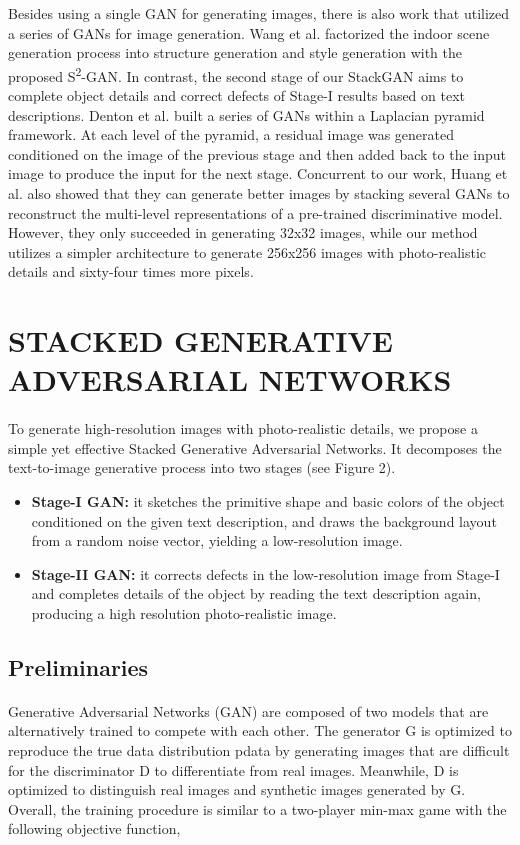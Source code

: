 \documentclass[a4paper,12pt,oneside]{article}
\begin{document}
Besides using a single GAN for generating images, there is also work that utilized a series of GANs for image generation. Wang et al. factorized the indoor scene generation process into structure generation and style generation with the proposed S\textsuperscript{2}-GAN. In contrast, the second stage of our StackGAN aims to complete object details and correct defects of Stage-I results based on text descriptions. Denton et al. built a series of GANs within a Laplacian pyramid framework. At each level of the pyramid, a residual image was generated conditioned on the image of the previous stage and then added back to the input image to produce the input for the next stage. Concurrent to our work, Huang et al. also showed that they can generate better images by stacking several GANs to reconstruct the multi-level representations of a pre-trained discriminative model. However, they only succeeded in generating 32x32 images, while our method utilizes a simpler architecture to generate 256x256 images with photo-realistic details and sixty-four times more pixels. 

\newpage
\section{STACKED GENERATIVE ADVERSARIAL NETWORKS}
\paragraph{}
To generate high-resolution images with photo-realistic details, we propose a simple yet effective Stacked Generative Adversarial Networks. It decomposes the text-to-image generative process into two stages (see Figure 2). 
\begin{itemize}
\item \textbf{Stage-I GAN:} it sketches the primitive shape and basic colors of the object conditioned on the given text description, and draws the background layout from a random noise vector, yielding a low-resolution image. 
\item \textbf{Stage-II GAN:} it corrects defects in the low-resolution image from Stage-I and completes details of the object by reading the text description again, producing a high resolution photo-realistic image. 
\end{itemize}

\subsection{Preliminaries }
\paragraph{}
Generative Adversarial Networks (GAN) are composed of two models that are alternatively trained to compete with each other. The generator G is optimized to reproduce the true data distribution pdata by generating images that are difficult for the discriminator D to differentiate from real images. Meanwhile, D is optimized to distinguish real images and synthetic images generated by G. Overall, the training procedure is similar to a two-player min-max game with the following objective function, 
\end{document}
